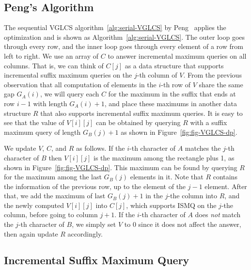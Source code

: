
\subsection{Peng's Algorithm}

The sequential VGLCS algorithm~\ref{alg:serial-VGLCS} by
Peng~\cite{Peng2011TheLC} applies the optimization and is shown as
Algorithm~\ref{alg:serial-VGLCS}.  The outer loop goes through every
row, and the inner loop goes through every element of a row from left to
right.  We use an array of $C$ to answer incremental maximum queries on
all columns.  That is, we can think of $C[j]$ as a data structure that
supports incremental suffix maximum queries on the $j$-th column of $V$.
From the previous observation that all computation of elements in the
$i$-th row of $V$ share the same gap $G_A(i)$, we will query each $C$
for the maximum in the suffix that ends at row $i-1$ with length
$G_A(i)+1$, and place these maximums in another data structure $R$ that
also supports incremental suffix maximum queries.  It is easy to see
that the value of $V[i][j]$ can be obtained by querying $R$ with a
suffix maximum query of length $G_B(j)+1$ as shown in
Figure~\ref{fig:fig-VGLCS-dp}.

We update $V$, $C$, and $R$ as follows.  If the $i$-th character of $A$
matches the $j$-th character of $B$ then $V[i][j]$ is the maximum among
the rectangle plus 1, as shown in Figure~\ref{fig:fig-VGLCS-dp}. This
maximum can be found by querying $R$ for the maximum among the last
$G_B(j)$ elements in it.  Note that $R$ contains the information of the
previous row, up to the element of the $j-1$ element.  After that, we
add the maximum of last $G_B(j)+1$ in the $j$-the column into $R$, and
the newly computed $V[i][j]$ into $C[j]$, which supports ISMQ on the
$j$-the column, before going to column $j+1$.  If the $i$-th character
of $A$ does {\em not} match the $j$-th character of $B$, we simply set
$V$ to 0 since it does not affect the answer, then again update $R$
accordingly.
 
 


\subsection{Incremental Suffix Maximum Query}

